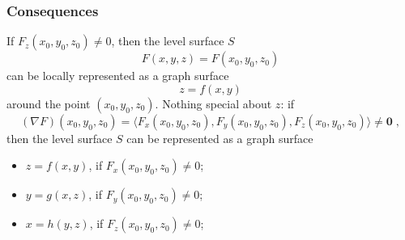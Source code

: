 \begin{frame}
  \frametitle{Consequences}

If $F_z(x_0,y_0,z_0) \neq 0$, then the level surface $S$
%
$$F(x,y,z) = F(x_0,y_0,z_0)$$
%
can be locally represented as a graph surface
%
$$z=f(x,y)$$
%
around the point $(x_0,y_0,z_0)$. \pause  Nothing special about $z$: if
%
$$(\nabla F)(x_0,y_0,z_0) = \langle F_x(x_0,y_0,z_0) , F_y(x_0,y_0,z_0), F_z(x_0,y_0,z_0)\rangle  \neq \textbf{0}\; ,$$
%
then the level surface $S$ can be represented as a graph surface
\begin{itemize}
  \item $z=f(x,y)$, if $F_x(x_0,y_0,z_0) \neq 0$;
  \item $y=g(x,z)$, if $F_y(x_0,y_0,z_0) \neq 0$;
  \item $x=h(y,z)$, if $F_z(x_0,y_0,z_0) \neq 0$;
\end{itemize}
\end{frame}
